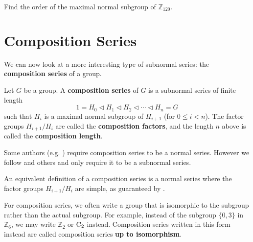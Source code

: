\begin{exercise}
    Find the order of the maximal normal subgroup of $\mathbb{Z}_{120}$.
\end{exercise}

\newpage

\section{Composition Series}
We can now look at a more interesting type of subnormal series: the \textbf{composition series} of a group.
\begin{definition}
    Let $G$ be a group. A \textbf{composition series} of $G$ is a subnormal series of finite length
    \[
        1 = H_0 \lhd H_1 \lhd H_2 \lhd \cdots \lhd H_n = G  
    \]
    such that $H_i$ is a maximal normal subgroup of $H_{i+1}$ (for $0 \leq i < n$). The factor groups $H_{i+1}/H_i$ are called the \textbf{composition factors}, and the length $n$ above is called the \textbf{composition length}.
\end{definition}
\begin{remark}
    Some authors (e.g. \cite{cohn_1982, clark_1984, proofwiki_compositionseriesdefinition}) require composition series to be a normal series. However we follow \cite{hungerford_1980, humphreys_1996, milne_2021} and others and only require it to be a subnormal series.
\end{remark}
\begin{remark}
    An equivalent definition of a composition series is a normal series where the factor groups $H_{i+1}/H_i$ are simple, as guaranteed by .
\end{remark}

For composition series, we often write a group that is isomorphic to the subgroup rather than the actual subgroup. For example, instead of the subgroup $\{0, 3\}$ in $\mathbb{Z}_6$, we may write $\mathbb{Z}_2$ or $\mathrm{C}_{2}$ instead. Composition series written in this form instead are called composition series \textbf{up to isomorphism}.

